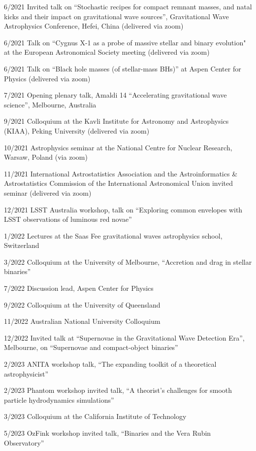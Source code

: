 \documentclass[margin,line]{res}
\begin{document}
\begin{resume}
6/2021 Invited talk on ``Stochastic recipes for compact remnant masses, and natal kicks and their impact on gravitational wave sources'', Gravitational Wave Astrophysics Conference, Hefei, China  (delivered via zoom)

6/2021 Talk on ``Cygnus X-1 as a probe of massive stellar and binary evolution" at the European Astronomical Society meeting (delivered via zoom)

6/2021 Talk on ``Black hole masses (of stellar-mass BHs)'' at Aspen Center for Physics (delivered via zoom)

7/2021 Opening plenary talk, Amaldi 14 ``Accelerating gravitational wave science'', Melbourne, Australia

9/2021 Colloquium at the Kavli Institute for Astronomy and Astrophysics (KIAA), Peking University (delivered via zoom)

10/2021 Astrophysics seminar at the National Centre for Nuclear Research, Warsaw, Poland (via zoom)

11/2021 International Astrostatistics Association and the Astroinformatics \& Astrostatistics Commission of the International Astronomical Union invited seminar (delivered via zoom)

12/2021 LSST Australia workshop, talk on ``Exploring common envelopes with LSST observations of luminous red novae''

1/2022 Lectures at the Saas Fee gravitational waves astrophysics school, Switzerland

3/2022 Colloquium at the University of Melbourne, ``Accretion and drag in stellar binaries'' 

7/2022 Discussion lead, Aspen Center for Physics

9/2022 Colloquium at the University of Queensland

11/2022 Australian National University Colloquium

12/2022	Invited talk at ``Supernovae in the Gravitational Wave Detection Era'', Melbourne, on ``Supernovae and compact-object binaries''

2/2023	ANITA workshop talk, ``The expanding toolkit of a theoretical astrophysicist''

2/2023	Phantom workshop invited talk, ``A theorist's challenges for smooth particle hydrodynamics simulations''

3/2023	Colloquium at the California Institute of Technology

5/2023 	OzFink workshop invited talk, ``Binaries and the Vera Rubin Observatory''


\end{resume}
\end{document}
